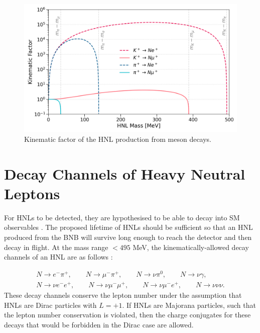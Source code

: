 
\begin{figure}[t] 
\centering    
\includegraphics[width=1.0\textwidth]{kinematics_factor}
\caption[Kinematic Factor of Heavy Neutral Leptons]{
Kinematic factor of the HNL production from meson decays.
}
\label{fig:KinematicsFactor}
\end{figure}

\section{Decay Channels of Heavy Neutral Leptons}
\label{sec2Decay}


For HNLs to be detected, they are hypothesised to be able to decay into SM observables \cite{HNLKelly}.
The proposed lifetime of HNLs should be sufficient so that an HNL produced from the BNB will survive long enough to reach the detector and then decay in flight.
At the mass range $< 495$ MeV, the kinematically-allowed decay channels of an HNL are as follows \cite{SBNHNL}:

\begin{equation}
\begin{split}
\label{eq:decay_channel}
	N\rightarrow e^{-}\pi^{+},\qquad 
	N\rightarrow \mu^{-}\pi^{+},\qquad
	N\rightarrow \nu \pi^{0},\qquad 
	N\rightarrow \nu \gamma,\qquad \\ 
	N\rightarrow \nu e^{-} e^{+},\qquad 
	N\rightarrow \nu \mu^{-} \mu^{+},\qquad 
	N\rightarrow \nu \mu^{-}e^{+},\qquad
	N\rightarrow \nu \nu \nu.   
\end{split}
\end{equation}
These decay channels conserve the lepton number under the assumption that HNLs are Dirac particles with $L=+1$.
If HNLs are Majorana particles, such that the lepton number conservation is violated, then the charge conjugates for these decays that would be forbidden in the Dirac case are allowed.

